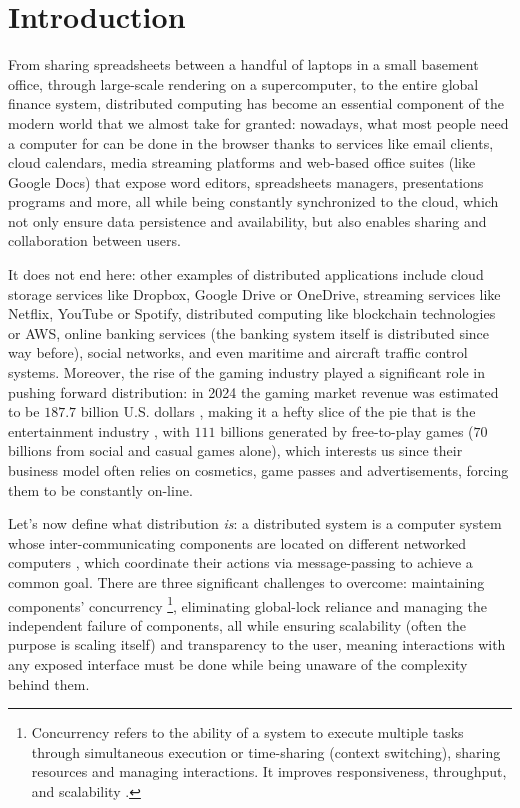 \section{Introduction}

From sharing spreadsheets between a handful of laptops in a small basement office, through large-scale rendering on a supercomputer, to the entire global finance system, distributed computing has become an essential component of the modern world that we almost take for granted: nowadays, what most people need a computer for can be done in the browser thanks to services like email clients, cloud calendars, media streaming platforms and web-based office suites (like Google Docs) that expose word editors, spreadsheets managers, presentations programs and more, all while being constantly synchronized to the cloud, which not only ensure data persistence and availability, but also enables sharing and collaboration between users. 

It does not end here: other examples of distributed applications include cloud storage services like Dropbox, Google Drive or OneDrive, streaming services like Netflix, YouTube or Spotify, distributed computing like blockchain technologies or AWS, online banking services (the banking system itself is distributed since way before), social networks, and even maritime and aircraft traffic control systems.
Moreover, the rise of the gaming industry played a significant role in pushing forward distribution: in 2024 the gaming market revenue was estimated to be $187.7$ billion U.S. dollars \cite{newzoo}, making it a hefty slice of the pie that is the entertainment industry \cite{pwc}, with $111$ billions generated by free-to-play games \cite{f2prevenue} ($70$ billions from social and casual games alone\cite{casualgames}), which interests us since their business model often relies on cosmetics, game passes and advertisements, forcing them to be constantly on-line. 


Let's now define what distribution \textit{is}: a distributed system is a computer system whose inter-communicating components are located on different networked computers \cite{tanenbaum2017distributed} \cite{Apt2009}, which coordinate their actions via message-passing to achieve a common goal. There are three significant challenges to overcome: maintaining components' concurrency \footnote{Concurrency refers to the ability of a system to execute multiple tasks through simultaneous execution or time-sharing (context switching), sharing resources and managing interactions. It improves responsiveness, throughput, and scalability \cite{OSconcepts} \cite{computerOrganization} \cite{george_coulouris_distributed_2012} \cite{parallelComputing} \cite{parallelDistributedHandbook}.}, eliminating global-lock reliance and managing the independent failure of components, all while ensuring scalability (often the purpose is scaling itself) and transparency to the user, meaning interactions with any exposed interface must be done while being unaware of the complexity behind them.

